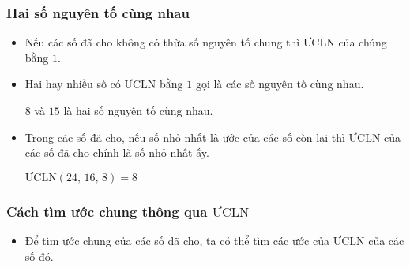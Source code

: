 \begin{tomtat}
	\subsubsection{Hai số nguyên tố cùng nhau}
\begin{itemize}
\item Nếu các số đã cho không có thừa số nguyên tố chung thì $\text{ƯCLN}$ của chúng bằng $1$. 
\item Hai hay nhiều số có $\text{ƯCLN}$ bằng $1$ gọi là các số nguyên tố cùng nhau.\\
\begin{vd} $8$ và $15$ là hai số nguyên tố cùng nhau.
\end{vd}
\end{itemize}
\begin{note}
\begin{itemize}
\item Trong các số đã cho, nếu số nhỏ nhất là ước của các số còn lại thì $\text{ƯCLN}$ của các số đã cho chính là số nhỏ nhất ấy.\\
\begin{vd} $\text{ƯCLN}\left( {24,\,16,\,8} \right) = 8$
\end{vd}
\end{itemize}
\end{note}
	\subsubsection{Cách tìm ước chung thông qua $\text{ƯCLN}$}
\begin{itemize}
\item Để tìm ước chung của các số đã cho, ta có thể tìm các ước của $\text{ƯCLN}$ của các số đó. 
\end{itemize}
\end{tomtat}
